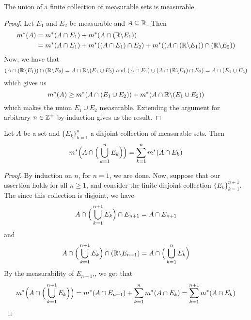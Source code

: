 \begin{lemma}\label{8.3.3}
    The union of a finite collection of measurable sets is measurable.
\end{lemma}
\begin{proof}
    Let $E_1$ and $E_2$ be measurable and $A \subseteq \mathbb{R}$. Then
    \begin{align*}
        m^\ast(A)   &=  m^\ast(A \cap E_1)+m^\ast(A \cap (\mathbb{R} \backslash E_1))   \\
                 &=  m^\ast(A \cap E_1)+m^\ast((A \cap E_1) \cap E_2)+m^\ast((A \cap
                    (\mathbb{R} \backslash E_1)) \cap (\mathbb{R} \backslash E_2))  \\
    \end{align*}
    Now, we have that
    \begin{equation*}
        (A \cap (\mathbb{R} \backslash E_1)) \cap (\mathbb{R} \backslash E_2)=A \cap \mathbb{R} \backslash (E_1 \cup
        E_2) \text{ and }
        (A \cap E_1) \cup (A \cap (\mathbb{R} \backslash E_1) \cap E_2)=A \cap (E_1 \cup E_2)
    \end{equation*}
    which gives us
    \begin{equation*}
        m^\ast(A) \geq m^\ast(A \cap (E_1 \cup E_2))+m^\ast(A \cap \mathbb{R} \backslash (E_1
        \cup E_2))
    \end{equation*}
    which makes the union $E_1 \cup E_2$ measurable. Extending the argument for
    arbitrary $n \in \mathbb{Z}^+$ by induction gives us the result.
\end{proof}

\begin{lemma}\label{8.3.4}
    Let $A$ be a set and  $\{E_k\}_{k=1}^n$ a disjoint collection of measurable
    sets. Then
    \begin{equation*}
        m^\ast\Big{(} A \cap \Big{(} \bigcup_{k=1}^n{E_k} \Big{)} \Big{)}=
        \sum_{k=1}^n{m^\ast(A \cap E_k)}
    \end{equation*}
\end{lemma}
\begin{proof}
    By induction on $n$, for $n=1$, we are done. Now, suppose that our assertion
    holds for all $n \geq 1$, and consider the finite disjoint collection
    $\{E_k\}_{k=1}^{n+1}$. The since this collection is disjoint, we have
    \begin{equation*}
        A \cap \Big{(} \bigcup_{k=1}^{n+1}{E_k} \Big{)} \cap E_{n+1}=
        A \cap E_{n+1}
    \end{equation*}
    and
     \begin{equation*}
        A \cap \Big{(} \bigcup_{k=1}^{n+1}{E_k} \Big{)} \cap (\mathbb{R} \backslash E_{n+1})=
        A \cap \Big{(} \bigcup_{k=1}^{n}{E_k} \Big{)}
    \end{equation*}
    By the measurability of $E_{n+1}$,, we get that
    \begin{equation*}
        m^\ast\Big{(} A \cap \Big{(} \bigcup_{k=1}^{n+1}{E_k} \Big{)} \Big{)}=
        m^\ast(A \cap E_{n+1})+\sum_{k=1}^n{m^\ast(A \cap E_k)}=
        \sum_{k=1}^{n+1}{m^\ast(A \cap E_k)}
    \end{equation*}
\end{proof}

